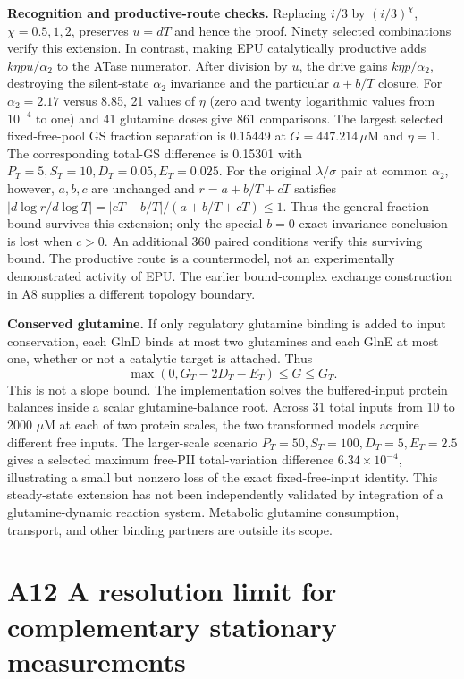 \documentclass[11pt]{article}
\begin{document}
\textbf{Recognition and productive-route checks.} Replacing $i/3$ by $(i/3)^\chi$, $\chi=0.5,1,2$, preserves $u=dT$ and hence the proof. Ninety selected combinations verify this extension. In contrast, making EPU catalytically productive adds $k\eta pu/\alpha_2$ to the ATase numerator. After division by $u$, the drive gains $k\eta p/\alpha_2$, destroying the silent-state $\alpha_2$ invariance and the particular $a+b/T$ closure. For $\alpha_2=2.17$ versus 8.85, 21 values of $\eta$ (zero and twenty logarithmic values from $10^{-4}$ to one) and 41 glutamine doses give 861 comparisons. The largest selected fixed-free-pool GS fraction separation is 0.15449 at $G=447.214\,\mu$M and $\eta=1$. The corresponding total-GS difference is 0.15301 with $P_T=5,S_T=10,D_T=0.05,E_T=0.025$. For the original $\lambda/\sigma$ pair at common $\alpha_2$, however, $a,b,c$ are unchanged and $r=a+b/T+cT$ satisfies $|d\log r/d\log T|=|cT-b/T|/(a+b/T+cT)\leq1$. Thus the general fraction bound survives this extension; only the special $b=0$ exact-invariance conclusion is lost when $c>0$. An additional 360 paired conditions verify this surviving bound. The productive route is a countermodel, not an experimentally demonstrated activity of EPU. The earlier bound-complex exchange construction in A8 supplies a different topology boundary.

\textbf{Conserved glutamine.} If only regulatory glutamine binding is added to input conservation, each GlnD binds at most two glutamines and each GlnE at most one, whether or not a catalytic target is attached. Thus
\[
 \max(0,G_T-2D_T-E_T)\leq G\leq G_T.
\]
This is not a slope bound. The implementation solves the buffered-input protein balances inside a scalar glutamine-balance root. Across 31 total inputs from 10 to 2000 $\mu$M at each of two protein scales, the two transformed models acquire different free inputs. The larger-scale scenario $P_T=50,S_T=100,D_T=5,E_T=2.5$ gives a selected maximum free-PII total-variation difference $6.34\times10^{-4}$, illustrating a small but nonzero loss of the exact fixed-free-input identity. This steady-state extension has not been independently validated by integration of a glutamine-dynamic reaction system. Metabolic glutamine consumption, transport, and other binding partners are outside its scope.

\section*{A12 A resolution limit for complementary stationary measurements}
\end{document}
